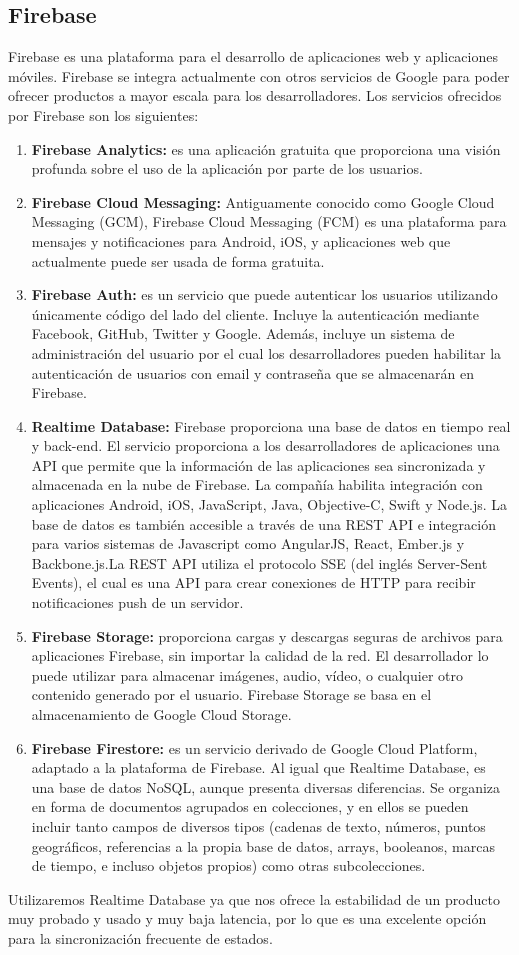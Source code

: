 \subsection{Firebase}
Firebase es una plataforma para el desarrollo de aplicaciones web y
 aplicaciones móviles. Firebase se integra actualmente con otros
 servicios de Google para poder ofrecer productos a mayor escala
 para los desarrolladores.
Los servicios ofrecidos por Firebase son los siguientes: 
\begin{enumerate}
\item \textbf{Firebase Analytics: } es una aplicación
 gratuita que proporciona una visión profunda sobre el
 uso de la aplicación por parte de los usuarios.
\item \textbf{Firebase Cloud Messaging: }
Antiguamente conocido como Google Cloud Messaging (GCM),
 Firebase Cloud Messaging (FCM) es una plataforma para mensajes 
y notificaciones para Android, iOS, y aplicaciones web que
 actualmente puede ser usada de forma gratuita.
\item \textbf{Firebase Auth:} es un servicio que puede autenticar
 los usuarios utilizando únicamente código del lado del cliente.
 Incluye la autenticación mediante Facebook, GitHub, Twitter y 
Google. Además, incluye un sistema de administración del usuario
 por el cual los desarrolladores pueden habilitar la autenticación de
 usuarios con email y contraseña que se almacenarán en Firebase.
\item \textbf{Realtime Database:}
Firebase proporciona una base de datos en tiempo real y back-end.
 El servicio proporciona a los desarrolladores de aplicaciones una API
 que permite que la información de las aplicaciones sea sincronizada
 y almacenada en la nube de Firebase. La compañía habilita integración
 con aplicaciones Android, iOS, JavaScript, Java, Objective-C, Swift
 y Node.js. La base de datos es también accesible a través de una 
REST API e integración para varios sistemas de Javascript como
 AngularJS, React, Ember.js y Backbone.js.La REST API utiliza el 
protocolo SSE (del inglés Server-Sent Events), el cual es una API
 para crear conexiones de HTTP para recibir notificaciones push 
de un servidor.
\item \textbf{Firebase Storage:} proporciona cargas y descargas
 seguras de archivos para aplicaciones Firebase, sin importar la 
calidad de la red. El desarrollador lo puede utilizar para almacenar
 imágenes, audio, vídeo, o cualquier otro contenido generado por
 el usuario. Firebase Storage se basa en el almacenamiento de
 Google Cloud Storage.
\item \textbf{Firebase Firestore:} es un servicio derivado de 
Google Cloud Platform, adaptado a la plataforma de Firebase.
 Al igual que Realtime Database, es una base de datos NoSQL,
 aunque presenta diversas diferencias. Se organiza en forma 
de documentos agrupados en colecciones, y en ellos se pueden
 incluir tanto campos de diversos tipos (cadenas de texto, números,
 puntos geográficos, referencias a la propia base de datos, arrays,
 booleanos, marcas de tiempo, e incluso objetos propios) como 
otras subcolecciones.
\end{enumerate}

Utilizaremos Realtime Database ya que nos ofrece la estabilidad 
de un producto muy probado y usado y muy baja latencia, por lo
 que es una excelente opción para la sincronización frecuente de 
estados.
